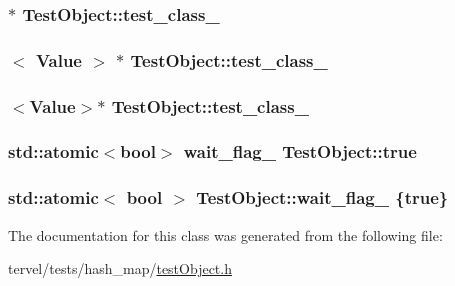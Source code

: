 \subsubsection[{test\+\_\+class\+\_\+}]{$\ast$ Test\+Object\+::test\+\_\+class\+\_\+}\label{class_test_object_a7e8e641112366f90c14d458b6167bee1}
\hypertarget{class_test_object_aff2586a58e6599398218f18cb0fca4f4}{}
\subsubsection[{test\+\_\+class\+\_\+}]{$<$ {\bf Value} $>$ $\ast$ Test\+Object\+::test\+\_\+class\+\_\+}\label{class_test_object_aff2586a58e6599398218f18cb0fca4f4}
\hypertarget{class_test_object_ab978d0afc9d91e3f0d51b52fe13eafb4}{}
\subsubsection[{test\+\_\+class\+\_\+}]{$<${\bf Value}$>$$\ast$ Test\+Object\+::test\+\_\+class\+\_\+}\label{class_test_object_ab978d0afc9d91e3f0d51b52fe13eafb4}
\hypertarget{class_test_object_a5837b96611f5cc5dc27a4b536831b489}{}
\subsubsection[{true}]{\setlength{\rightskip}{0pt plus 5cm}std\+::atomic$<$bool$>$ {\bf wait\+\_\+flag\+\_\+} Test\+Object\+::true}\label{class_test_object_a5837b96611f5cc5dc27a4b536831b489}
\hypertarget{class_test_object_a6ccfdc908c6a49be86e380474a3448c0}{}
\subsubsection[{wait\+\_\+flag\+\_\+}]{\setlength{\rightskip}{0pt plus 5cm}std\+::atomic$<$ bool $>$ Test\+Object\+::wait\+\_\+flag\+\_\+ \{{\bf true}\}}\label{class_test_object_a6ccfdc908c6a49be86e380474a3448c0}


The documentation for this class was generated from the following file\+:\begin{DoxyCompactItemize}
\item 
tervel/tests/hash\+\_\+map/\hyperlink{hash__map_2test_object_8h}{test\+Object.\+h}\end{DoxyCompactItemize}
